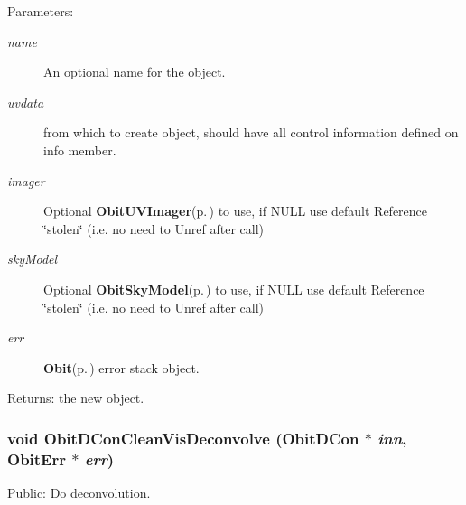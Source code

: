 \begin{Desc}
\item[Parameters:]
\begin{description}
\item[{\em name}]An optional name for the object. \item[{\em uvdata}]from which to create object, should have all control information defined on info member. \item[{\em imager}]Optional {\bf Obit\-UVImager}{\rm (p.\,\pageref{structObitUVImager})} to use, if NULL use default Reference \char`\"{}stolen\char`\"{} (i.e. no need to Unref after call) \item[{\em sky\-Model}]Optional {\bf Obit\-Sky\-Model}{\rm (p.\,\pageref{structObitSkyModel})} to use, if NULL use default Reference \char`\"{}stolen\char`\"{} (i.e. no need to Unref after call) \item[{\em err}]{\bf Obit}{\rm (p.\,\pageref{structObit})} error stack object. \end{description}
\end{Desc}
\begin{Desc}
\item[Returns:]the new object. \end{Desc}
\subsubsection{\setlength{\rightskip}{0pt plus 5cm}void Obit\-DCon\-Clean\-Vis\-Deconvolve ({\bf Obit\-DCon} $\ast$ {\em inn}, {\bf Obit\-Err} $\ast$ {\em err})}\label{ObitDConCleanVis_8h_a16}


Public: Do deconvolution. 

